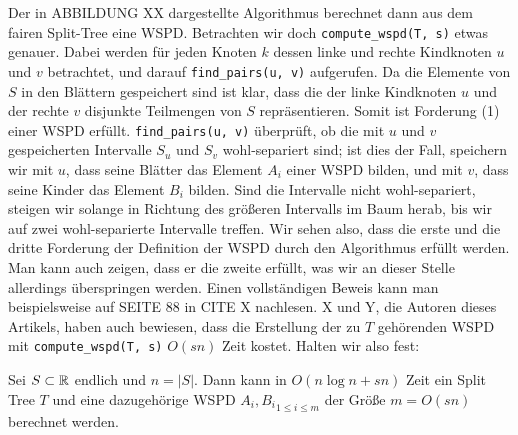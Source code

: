 	Der in ABBILDUNG XX dargestellte Algorithmus berechnet dann aus dem fairen Split-Tree eine WSPD.
	Betrachten wir doch \texttt{compute\_wspd(T, s)} etwas genauer. Dabei werden für jeden Knoten $k$ dessen linke und rechte Kindknoten $u$ und $v$ betrachtet, und darauf \texttt{find\_pairs(u, v)} aufgerufen. Da die Elemente von $S$ in den Blättern gespeichert sind ist klar, dass die der linke Kindknoten $u$ und der rechte $v$ disjunkte Teilmengen von $S$ repräsentieren. Somit ist Forderung (1) einer WSPD erfüllt. \texttt{find\_pairs(u, v)} überprüft, ob die mit $u$ und $v$ gespeicherten Intervalle $S_u$ und $S_v$ wohl-separiert sind; ist dies der Fall, speichern wir mit $u$, dass seine Blätter das Element $A_i$ einer WSPD bilden, und mit $v$, dass seine Kinder das Element $B_i$ bilden. Sind die Intervalle nicht wohl-separiert, steigen wir solange in Richtung des größeren Intervalls im Baum herab, bis wir auf zwei wohl-separierte Intervalle treffen. Wir sehen also, dass die erste und die dritte Forderung der Definition der WSPD durch den Algorithmus erfüllt werden. Man kann auch zeigen, dass er die zweite erfüllt, was wir an dieser Stelle allerdings überspringen werden. Einen vollständigen Beweis kann man beispielsweise auf SEITE 88 in CITE X nachlesen. X und Y, die Autoren dieses Artikels, haben auch bewiesen, dass die Erstellung der zu $T$ gehörenden WSPD mit \texttt{compute\_wspd(T, s)} $O(sn)$ Zeit kostet. Halten wir also fest:
	\begin{theorem}
		\label{theo:wspdtime}
		Sei $S \subset \mathbb{R}$ endlich und $n = |S|$. Dann kann in $O(n \log n + sn)$ Zeit ein Split Tree $T$ und eine dazugehörige WSPD ${A_i, B_i}_{1 \leq i \leq m}$ der Größe $m = O(sn)$ berechnet werden.
	\end{theorem}